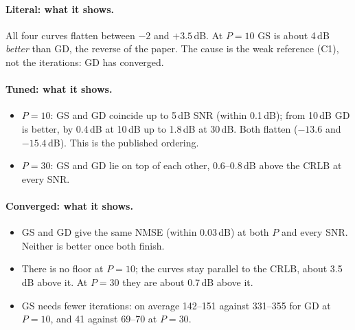 \documentclass[11pt,a4paper]{article}
\begin{document}
\paragraph{Literal: what it shows.}
All four curves flatten between $-2$ and $+3.5$\,dB. At $P=10$ GS is about 4\,dB \emph{better} than
GD, the reverse of the paper. The cause is the weak reference (C1), not the iterations: GD has
converged.

\paragraph{Tuned: what it shows.}
\begin{itemize}[leftmargin=*,itemsep=1pt]
  \item $P=10$: GS and GD coincide up to 5\,dB SNR (within 0.1\,dB); from 10\,dB GD is better, by
        0.4\,dB at 10\,dB up to 1.8\,dB at 30\,dB. Both flatten ($-13.6$ and $-15.4$\,dB). This is
        the published ordering.
  \item $P=30$: GS and GD lie on top of each other, 0.6--0.8\,dB above the CRLB at every SNR.
\end{itemize}

\paragraph{Converged: what it shows.}
\begin{itemize}[leftmargin=*,itemsep=1pt]
  \item GS and GD give the same NMSE (within 0.03\,dB) at both $P$ and every SNR. Neither is
        better once both finish.
  \item There is no floor at $P=10$; the curves stay parallel to the CRLB, about 3.5\,dB above it.
        At $P=30$ they are about 0.7\,dB above it.
  \item GS needs fewer iterations: on average 142--151 against 331--355 for GD at $P=10$, and
        41 against 69--70 at $P=30$.
\end{itemize}
\end{document}
